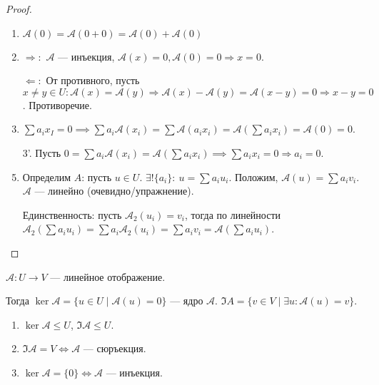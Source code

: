 \begin{proof}
     \begin{enumerate}
         \item $\mathcal{A}(0) = \mathcal{A}(0+0) = \mathcal{A}(0) + \mathcal{A}(0)$ 
         \item $\Rightarrow\!:$  $\mathcal{A}$ --- инъекция,  $\mathcal{A}(x) = 0, \mathcal{A}(0)=0 \Rightarrow x = 0$. 

             $\Leftarrow\!:$ От противного, пусть $x \neq y \in U : \mathcal{A}(x) = \mathcal{A}(y) \Rightarrow \mathcal{A}(x) - \mathcal{A}(y) = \mathcal{A}(x - y) = 0 \Rightarrow x - y = 0$. Противоречие.
         \item  $\sum a_i x_I = 0 \implies \sum a_i \mathcal{A}(x_i) = \sum \mathcal{A}(a_i x_i) = \mathcal{A}(\sum a_i x_i) = \mathcal{A}(0) = 0$.
         \item[3'.] Пусть $0 = \sum a_i \mathcal{A}(x_i) = \mathcal{A}(\sum a_i x_i) \implies \sum a_i x_i = 0 \Rightarrow a_i = 0$.
         \item Определим $A$: пусть  $u \in U$.  $\exists! \{a_i\}\!:\ u = \sum a_i u_i$. Положим,  $\mathcal{A}(u) = \sum a_i v_i$.  $\mathcal{A}$ --- линейно (очевидно/упражнение).

             Единственность: пусть  $\mathcal{A}_2(u_i) = v_i$, тогда  по линейности  $\mathcal{A}_2(\sum a_i u_i) = \sum a_i \mathcal{A}_2(u_i) = \sum a_i v_i = \mathcal{A}(\sum a_i u_i)$.
    \end{enumerate}
\end{proof}
\begin{definition}
    $\mathcal{A}\!: U \to V$ --- линейное отображение.

    Тогда  $\ker \mathcal{A} = \{ u \in U \mid \mathcal{A}(u) = 0\}$ --- ядро  $\mathcal{A}$.  $\Im A = \{ v \in V \mid \exists u: \mathcal{A}(u) = v\}$.
\end{definition}
\begin{properties}
    \begin{enumerate}
        \item $\ker \mathcal{A} \le U$, $\Im \mathcal{A} \le U$.
        \item $\Im \mathcal{A} = V \iff \mathcal{A}$ --- сюръекция.
        \item $\ker \mathcal{A} = \{0\} \iff \mathcal{A}$ --- инъекция.
    \end{enumerate}
\end{properties}
